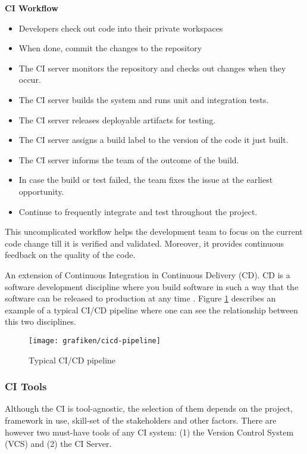 \textbf{CI Workflow}

\begin{itemize}
\item Developers check out code into their private workspaces
\item When done, commit the changes to the repository
\item The CI server monitors the repository and checks out changes when they occur.
\item The CI server builds the system and runs unit and integration tests.
\item The CI server releases deployable artifacts for testing.
\item The CI server assigns a build label to the version of the code it just built.
\item The CI server informs the team of the outcome of the build.
\item In case the build or test failed, the team fixes the issue at the earliest opportunity.
\item Continue to frequently integrate and test throughout the project.
\end{itemize}

This uncomplicated workflow helps the development team to focus on the current code change till it is verified and validated. Moreover, it provides continuous feedback on the quality of the code.

An extension of Continuous Integration in Continuous Delivery (CD). CD is a software development discipline where you build software in such a way that the software can be released to production at any time \cite{Fowler2013}. Figure \ref{fig:cicdpipeline} describes an example of a typical CI/CD pipeline where one can see the relationship between this two disciplines.

\begin{figure}[ht]
	\centering
    \texttt{[image: grafiken/cicd-pipeline]}
    \caption{Typical CI/CD pipeline \cite{Chacon2009}}
    \label{fig:cicdpipeline}
\end{figure}

\subsubsection{CI Tools}

Although the CI is tool-agnostic, the selection of them depends on the project, framework in use, skill-set of the stakeholders and other factors. There are however two must-have tools of any CI system: (1) the Version Control System (VCS) and (2) the CI Server.

